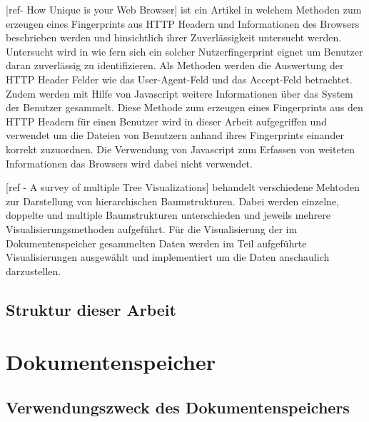 \documentclass[
    fontsize=12pt,
    headings=small,
    parskip=half,           %
    bibliography=totoc,
    numbers=noenddot,       %
    open=any,               %
    ]{scrreprt}
\begin{document}
[ref- How Unique is your Web Browser] ist ein Artikel in welchem Methoden zum erzeugen eines Fingerprints aus HTTP Headern und Informationen des Browsers beschrieben werden und hinsichtlich ihrer Zuverlässigkeit untersucht werden.
Untersucht wird in wie fern sich ein solcher Nutzerfingerprint eignet um Benutzer daran zuverlässig zu identifizieren.
Als Methoden werden die Auswertung der HTTP Header Felder wie das User-Agent-Feld und das Accept-Feld betrachtet.
Zudem werden mit Hilfe von Javascript weitere Informationen über das System der Benutzer gesammelt.
Diese Methode zum erzeugen eines Fingerprints aus den HTTP Headern für einen Benutzer wird in dieser Arbeit aufgegriffen und verwendet um die Dateien von Benutzern anhand ihres Fingerprints einander korrekt zuzuordnen.
Die Verwendung von Javascript zum Erfassen von weiteten Informationen das Browsers wird dabei nicht verwendet.

[ref - A survey of multiple Tree Visualizations] behandelt verschiedene Mehtoden zur Darstellung von hierarchischen Baumstrukturen.
Dabei werden einzelne, doppelte und multiple Baumstrukturen unterschieden und jeweils mehrere Visualisierungsmethoden aufgeführt.
Für die Visualisierung der im Dokumentenspeicher gesammelten Daten werden im Teil aufgeführte Visualisierungen ausgewählt und implementiert um die Daten anschaulich darzustellen.

\section{Struktur dieser Arbeit}


\chapter{Dokumentenspeicher} \label{Kap:Dokumentenspeicher}

    \section{Verwendungszweck des Dokumentenspeichers} 
\end{document}
